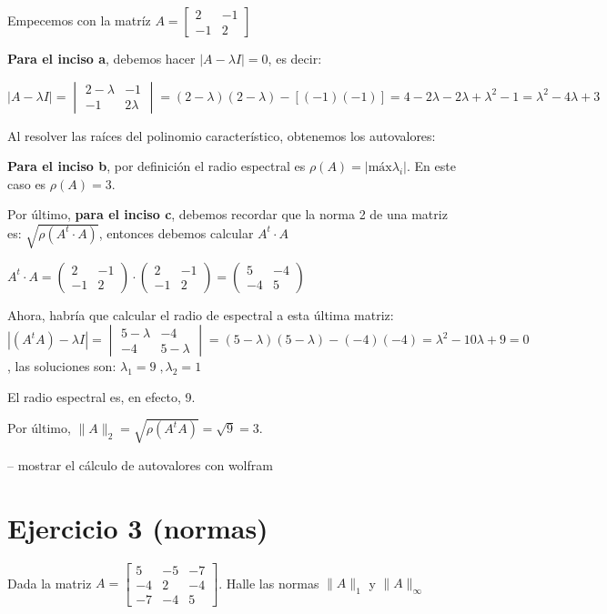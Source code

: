 \documentclass[11pt]{article}
\begin{document}
	Empecemos con la matríz $A=\begin{bmatrix}
		2 & -1\\
		-1 & 2
	\end{bmatrix}$

	\textbf{Para el inciso a}, debemos hacer $|A-\lambda I|=0$, es decir:
	
	$|A-\lambda I|=\begin{vmatrix}
		2 - \lambda & -1\\
		-1 & 2 \lambda
	\end{vmatrix} = (2-\lambda)(2-\lambda) - [(-1)(-1)]=4-2\lambda-2\lambda+\lambda^2-1=\boxed{\lambda^2-4\lambda+3}$
	
	Al resolver las raíces del polinomio característico, obtenemos los autovalores: 
	
	\textbf{Para el inciso b}, por definición el radio espectral es $\rho(A)=|\text{máx} \lambda_i|$. En este caso es $\rho(A)=3$.
	
	Por último, \textbf{para el inciso c}, debemos recordar que la norma 2 de una matriz es: $\sqrt{\rho(A^t\cdot A)}$, entonces debemos calcular $A^t \cdot A$
	
	$A^t\cdot A = \begin{pmatrix}
		2 & -1\\
		-1 & 2
	\end{pmatrix} \cdot \begin{pmatrix}
	2 & -1\\
	-1 & 2
\end{pmatrix}=\begin{pmatrix}
5 & -4\\
-4 & 5
\end{pmatrix}$

	Ahora, habría que calcular el radio de espectral a esta última matriz:
	$|(A^tA)-\lambda I|=\begin{vmatrix}
		5 - \lambda & -4\\
		-4 & 5-\lambda
	\end{vmatrix}=(5-\lambda)(5-\lambda)-(-4)(-4)=\lambda^2-10\lambda+9=0$, las soluciones son: $\lambda_1=9 \;, \lambda_2=1$

	El radio espectral es, en efecto, 9.
	
	Por último, $\lVert A \rVert_2=\sqrt{\rho(A^tA)}=\sqrt{9}=3$.
	
	-- mostrar el cálculo de autovalores con wolfram
	
	\section{Ejercicio 3 (normas)}
	Dada la matriz $A=\begin{bmatrix}
		5 & -5 & -7\\
		-4 & 2 & -4 \\
		-7 & -4 & 5
	\end{bmatrix}$. Halle las normas $\lVert A \rVert_1$ y $\lVert A \rVert_\infty$
\end{document}
